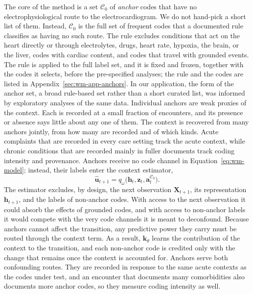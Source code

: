 The core of the method is a set $\mathcal{C}_0$ of \emph{anchor} codes that have no electrophysiological route to the electrocardiogram. We do not hand-pick a short list of them. Instead, $\mathcal{C}_0$ is the full set of frequent codes that a documented rule classifies as having no such route. The rule excludes conditions that act on the heart directly or through electrolytes, drugs, heart rate, hypoxia, the brain, or the liver, codes with cardiac content, and codes that travel with grounded events. The rule is applied to the full label set, and it is fixed and frozen, together with the codes it selects, before the pre-specified analyses; the rule and the codes are listed in Appendix~\ref{sec:wm-app-anchors}. In our application, the form of the anchor set, a broad rule-based set rather than a short curated list, was informed by exploratory analyses of the same data. %
Individual anchors are weak proxies of the context. Each is recorded at a small fraction of encounters, and its presence or absence says little about any one of them. The context is recovered from many anchors jointly, from how many are recorded and of which kinds. Acute complaints that are recorded in every care setting track the acute context, while chronic conditions that are recorded mainly in fuller documents track coding intensity and provenance. Anchors receive no code channel in Equation~\eqref{eq:wm-model}; instead, their labels enter the context estimator,
\begin{equation}
\label{eq:wm-context}
\hat{\mathbf{u}}_{t+1}=q_\omega\big(\mathbf{h}_t,\mathbf{z}_t,\mathbf{a}^{\mathcal{C}_0}_t\big).
\end{equation}
The estimator excludes, by design, the next observation $\mathbf{X}_{t+1}$, its representation $\mathbf{h}_{t+1}$, and the labels of non-anchor codes. With access to the next observation it could absorb the effects of grounded codes, and with access to non-anchor labels it would compete with the very code channels it is meant to deconfound. Because anchors cannot affect the transition, any predictive power they carry must be routed through the context term. As a result, $\mathbf{k}_\theta$ learns the contribution of the context to the transition, and each non-anchor code is credited only with the change that remains once the context is accounted for. Anchors serve both confounding routes. They are recorded in response to the same acute contexts as the codes under test, and an encounter that documents many comorbidities also documents more anchor codes, so they measure coding intensity as well.

